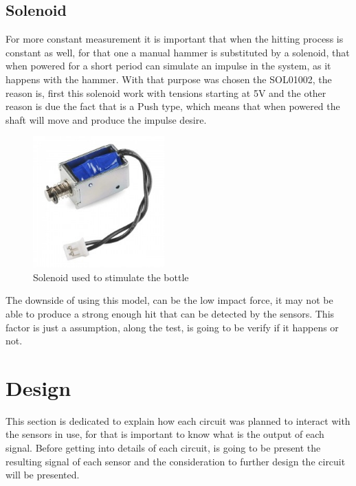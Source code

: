 \subsection{Solenoid}
For more constant measurement it is important that when the hitting process is constant as well, for that one a manual hammer is substituted by a solenoid, that when powered for a short period can simulate an impulse in the system, as it happens with the hammer. With that purpose was chosen the SOL01002, the reason is, first this solenoid work with tensions starting at 5V and the other reason is due the fact that is a Push type, which means that when powered the shaft will move and produce the impulse desire.
\begin{figure}[]
    \centering
    \includegraphics[width=0.45\textwidth]{Chapters/4CHP/Figures/solenoide.jpg}
    \caption{Solenoid used to stimulate the bottle}
    \label{fig:solenoid}
\end{figure}
The downside of using this model, can be the low impact force, it may not be able to produce a strong enough hit that can be detected by the sensors. This factor is just a assumption, along the test, is going to be verify if it happens or not.
\section{Design}
This section is dedicated to explain how each circuit was planned to interact with the sensors in use, for that is important to know what is the output of each signal. Before getting into details of each circuit, is going to be present the resulting signal of each sensor and the consideration to further design the circuit will be presented.

